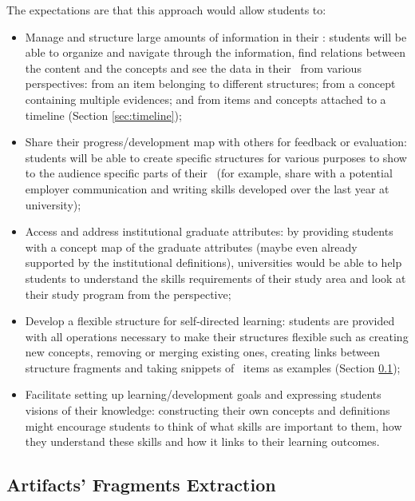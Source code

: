 \FloatBarrier

The expectations are that this approach would allow students to:
\begin{itemize}
  \setlength{\parskip}{0pt}
  \setlength{\parsep}{0pt}
  \setlength{\itemsep}{2pt}
  \item Manage and structure large amounts of information in their \ep:
  students will be able to organize and navigate through the information, find
  relations between the content and the concepts and see the data in their
  \ep~from various perspectives: from an item belonging to different
  structures; from a concept containing multiple evidences; and from items and
  concepts attached to a timeline (Section \ref{sec:timeline});

\item Share their progress/development map with others for feedback or
evaluation: students will be able to create specific structures for various
purposes to show to the audience specific parts of their \ep~(for example,
share with a potential employer communication and writing skills developed over
the last year at university);

\item Access and address institutional graduate attributes: by providing
students with a concept map of the graduate attributes (maybe even already
supported by the institutional definitions), universities would be able to
help students to understand the skills requirements of their study area and look
at their study program from the \LLLs perspective;

\item Develop a flexible structure for self-directed learning: students are
provided with all operations necessary to make their structures flexible such as
creating new concepts, removing or merging existing ones, creating links between
structure fragments and taking snippets of \ep~items as examples (Section
\ref{sec:frag});

\item Facilitate setting up learning/development goals and expressing students
visions of their knowledge: constructing their own concepts and definitions
might encourage students to think of what skills are important to them, how they
understand these skills and how it links to their learning outcomes.
\end{itemize}


\subsection{Artifacts' Fragments Extraction}
\label{sec:frag}

